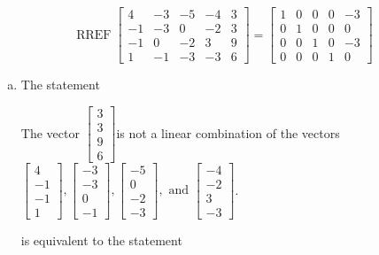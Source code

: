 \begin{exerciseAnswer} 
\[\operatorname{RREF}  \left[\begin{array}{cccc|c}
4 & -3 & -5 & -4 & 3 \\
-1 & -3 & 0 & -2 & 3 \\
-1 & 0 & -2 & 3 & 9 \\
1 & -1 & -3 & -3 & 6
\end{array}\right] = \left[\begin{array}{cccc|c}
1 & 0 & 0 & 0 & -3 \\
0 & 1 & 0 & 0 & 0 \\
0 & 0 & 1 & 0 & -3 \\
0 & 0 & 0 & 1 & 0
\end{array}\right] \]
\begin{enumerate}[(a)]
\item  The statement 
\begin{center}\begin{minipage}{0.8\textwidth}
 The vector \( \left[\begin{array}{c}
3 \\
3 \\
9 \\
6
\end{array}\right] \)is not a linear combination of the vectors \( \left[\begin{array}{c}
4 \\
-1 \\
-1 \\
1
\end{array}\right] , \left[\begin{array}{c}
-3 \\
-3 \\
0 \\
-1
\end{array}\right] , \left[\begin{array}{c}
-5 \\
0 \\
-2 \\
-3
\end{array}\right] , \text{ and } \left[\begin{array}{c}
-4 \\
-2 \\
3 \\
-3
\end{array}\right] \). 
\end{minipage}\end{center}
     is equivalent to the statement 
\begin{center}\begin{minipage}{0.8\textwidth}

\end{minipage}
\end{center}
\end{enumerate}
\end{exerciseAnswer}
